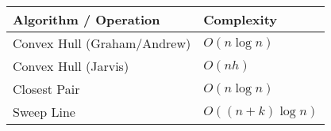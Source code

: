 \begin{tabular}{|l|l|}
\hline
Algorithm / Operation & Complexity \\[1mm]
\hline
Convex Hull (Graham/Andrew) & $O(n \log n)$ \\[1mm]
Convex Hull (Jarvis) & $O(nh)$ \\[1mm]
Closest Pair & $O(n \log n)$ \\[1mm]
Sweep Line & $O((n+k)\log n)$ \\[1mm]
\hline
\end{tabular}